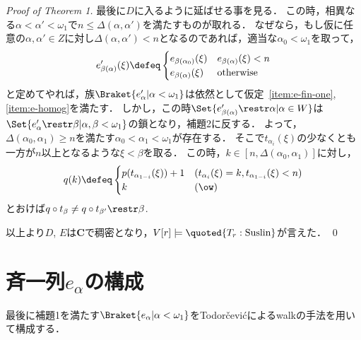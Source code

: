 \documentclass[a4j]{ltjsarticle}
\begin{document}
\begin{proof}[Proof of Theorem 1]
 最後に$D$に入るように延ばせる事を見る．
 この時，相異なる$\alpha < \alpha' < \omega_1$で$n \leq \Delta(\alpha, \alpha')$を満たすものが取れる．
 なぜなら，もし仮に任意の$\alpha, \alpha' \in Z$に対し$\Delta(\alpha, \alpha') < n$となるのであれば，適当な$\alpha_0 < \omega_1$を取って，
 \[
  e'_{\beta(\alpha)}(\xi) \defeq \begin{cases}
                                  e_{\beta(\alpha_0)}(\xi) & e_{\beta(\alpha)}(\xi) < n\\
                                  e_{\beta(\alpha)}(\xi)   & \text{otherwise}
                                 \end{cases}
 \]
 と定めてやれば，族$\Braket{e'_\alpha | \alpha < \omega_1}$は依然として仮定~\ref{item:e-fin-one}, \ref{item:e-homog}を満たす．
 しかし，この時$\Set{e'_{\beta(\alpha)} \restr \alpha | \alpha \in W}$は$\Set{e'_\alpha \restr \beta | \alpha, \beta < \omega_1}$の鎖となり，補題2に反する．
 よって，$\Delta(\alpha_0, \alpha_1) \geq n$を満たす$\alpha_0 < \alpha_1 < \omega_1$が存在する．
 そこで$t_{\alpha_i}(\xi)$の少なくとも一方が$n$以上となるような$\xi < \beta$を取る．
 この時，$k \in [n, \Delta(\alpha_0, \alpha_1)]$に対し，
 \[
  q(k) \defeq
  \begin{cases}
   p(t_{\alpha_{1-i}}(\xi)) + 1 & (t_{\alpha_i}(\xi) = k, t_{\alpha_{1-i}}(\xi) < n)\\
   k & (\ow)
 \end{cases}
 \]
 とおけば$q \circ t_\beta \neq q \circ t_{\beta'} \restr \beta$.

 以上より$D$, $E$は$\mathbf{C}$で稠密となり，$V[r] \models \quoted{T_r: \text{Suslin}}$が言えた． \qed
\end{proof}

\section{斉一列$e_\alpha$の構成}
最後に補題1を満たす$\Braket{e_\alpha | \alpha < \omega_1}$をTodor\v{c}evi\'{c}によるwalkの手法を用いて構成する．
\end{document}
